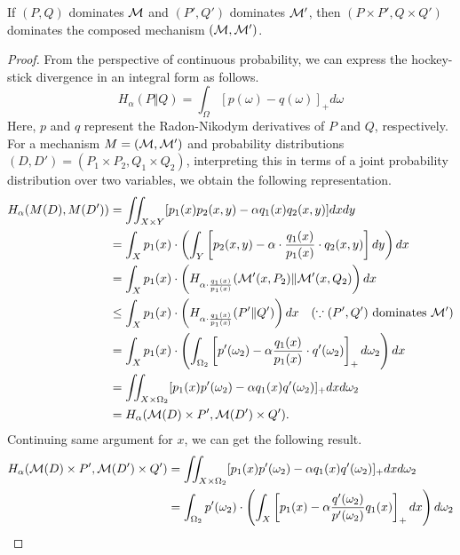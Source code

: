 \documentclass{article}
\begin{document}
\begin{theorem}
    If $(P,Q)$ dominates ${\mathcal{M}}$ and $(P',Q')$ dominates ${\mathcal{M}}'$, then $(P\times P', Q \times Q')$ dominates the composed mechanism $({\mathcal{M}},{\mathcal{M}}')$.

    \begin{proof}
        From the perspective of continuous probability, we can express the hockey-stick divergence in an integral form as follows.
        \begin{equation*}
            H_\alpha(P\Vert Q) = \int_\Omega [p(\omega)-q(\omega)]_+ d\omega
        \end{equation*}
        Here, $p$  and $q$ represent the Radon-Nikodym derivatives of $P$ and $Q$, respectively. For a mechanism $M = ({\mathcal{M}}, {\mathcal{M}}')$ and probability distributions $(D,D') =(P_1 \times P_2, Q_1 \times Q_2)$, interpreting this in terms of a joint probability distribution over two variables, we obtain the following representation.
    \begin{align*}
        H_\alpha(M(D),M(D')) &= \iint_{X\times Y}[p_1(x)p_2(x,y) - \alpha q_1(x)q_2(x,y) ]dxdy\\
        &= \int_X p_1(x) \cdot \left(\int_Y\left[p_2(x,y) - \alpha\cdot\frac{q_1(x)}{p_1(x)}\cdot q_2(x,y)  \right]dy \right)dx\\
        &=\int_X p_1(x) \cdot\left( H_{\alpha \cdot \frac{q_1(x)}{p_1(x)}}({\mathcal{M}}'(x,P_2)\Vert {\mathcal{M}}'(x,Q_2) \right)dx \\
        &\le \int_X p_1(x) \cdot\left( H_{\alpha \cdot \frac{q_1(x)}{p_1(x)}} (P'\Vert Q')\right)dx \quad (\because (P',Q') \text{ dominates } {\mathcal{M}}')\\
        &= \int_X p_1(x) \cdot \left(\int_{\Omega_2} \left[p'(\omega_2) - \alpha\frac{q_1(x)}{p_1(x)}\cdot q'(\omega_2) \right]_+ d\omega_2 \right)dx \\
        &=\iint _{X \times \Omega_2}[p_1(x)p'(\omega_2) - \alpha q_1(x)q'(\omega_2)]_+ dxd\omega_2 \\
        &= H_\alpha ({\mathcal{M}}(D) \times P', {\mathcal{M}}(D') \times Q').
    \end{align*}
    Continuing same argument for $x$, we can get the following result.
    \begin{align*}
      H_\alpha (\gM(D) \times P', \gM(D') \times Q') 
      &= \iint _{X \times \Omega_2}[p_1(x)p'(\omega_2) - \alpha q_1(x)q'(\omega_2)]_+ dxd\omega_2\\
      &= \int_{\Omega_2}p'(\omega_2)\cdot \left( \int_X\left[p_1(x) - \alpha \frac{q'(\omega_2)}{p'(\omega_2)} q_1(x) \right]_+dx \right) d\omega_2\\

\end{align*}
\end{proof}
\end{theorem}
\end{document}
